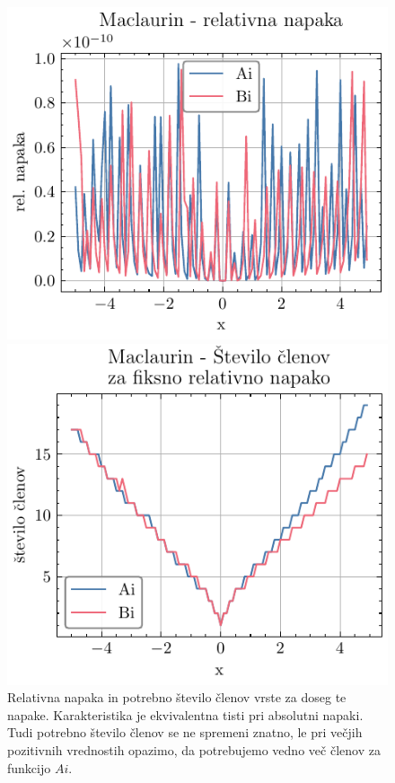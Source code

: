 \documentclass[slovene,11pt,a4paper]{article}
\begin{document}
\begin{figure}[h!]
  \centering
  \begin{minipage}{0.48\textwidth}
    \centering
    \includegraphics[width=\linewidth]{graphs/mac_rel_err.pdf}
  \end{minipage}\hfill
  \begin{minipage}{0.48\textwidth}
    \centering
    \includegraphics[width=\linewidth]{graphs/mac_rel_err_n.pdf}
  \end{minipage}
  \caption{Relativna napaka in potrebno število členov vrste za doseg te napake. Karakteristika je ekvivalentna tisti pri absolutni napaki. Tudi potrebno število členov se ne spremeni znatno, le pri večjih pozitivnih vrednostih opazimo, da potrebujemo vedno več členov za funkcijo $Ai$.}
  \label{fig: mac_rel_err}
\end{figure}
\end{document}
